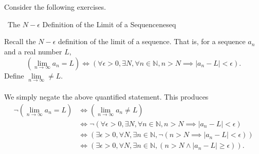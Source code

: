         \pagebreak
        \vphantom
        \\
        \\
        Consider the following exercises.
        \begin{exercise}{\Difficulty\,\Difficulty\,\,The \(N-\epsilon\) Definition of the Limit of a Sequence}{neseq}
        
            Recall the \(N-\epsilon\) definition of the limit of a sequence. That is, for a sequence \(a_n\) and a real number \(L\),
            \begin{equation*}
                \left(\lim_{n\to\infty}a_n=L\right)\iff(\forall \epsilon >0,\exists N,\forall n \in\mathbb{N},n>N\implies|a_n-L|<\epsilon).
            \end{equation*}
            Define \(\lim\limits_{n\to\infty}\neq L\).
            \\
            \\
            We simply negate the above quantified statement. This produces
            \begin{align*}
                 \neg\left(\lim_{n\to\infty}a_n=L\right)&\iff\left(\lim_{n\to\infty}a_n\neq L\right) \\
                 &\iff\neg(\forall \epsilon >0,\exists N,\forall n \in\mathbb{N},n>N\implies|a_n-L|<\epsilon) \\
                 &\iff(\exists \epsilon >0,\forall N,\exists n \in\mathbb{N},\neg(n>N\implies|a_n-L|<\epsilon)) \\
                 &\iff(\exists \epsilon >0,\forall N,\exists n \in\mathbb{N},(n>N\wedge|a_n-L|\geq\epsilon)).
            \end{align*}
        
        \end{exercise}
